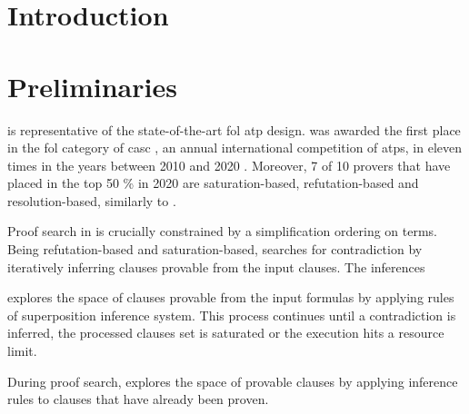 \documentclass{article}
\begin{document}
\maketitle

\begin{abstract}

\end{abstract}

\section{Introduction}



\section{Preliminaries}

\vampire{} \cite{10.1007/978-3-642-39799-8_1}
is representative
of the state-of-the-art \gls{fol} \gls{atp} design.
\vampire{} was awarded the first place
in the \gls{fol} category of \gls{casc} \cite{},
an annual international competition of \glspl{atp},
in eleven times in the years between 2010 and 2020 \cite{}.
Moreover, 7 of 10 provers that have placed in the top 50 \% in 2020
are saturation-based, refutation-based and resolution-based,
similarly to \vampire{} \cite{}.



Proof search in \vampire{} is crucially constrained
by a simplification ordering on terms.
Being refutation-based and saturation-based,
\vampire{} searches for contradiction
by iteratively inferring clauses provable from the input clauses.
The inferences 

explores the space of clauses provable
from the input formulas
by applying rules of superposition inference system.
This process continues until a contradiction is inferred,
the processed clauses set is saturated
or the execution hits a resource limit.

During proof search,
\vampire{} explores the space of provable clauses
by applying inference rules to clauses
that have already been proven.
\end{document}
